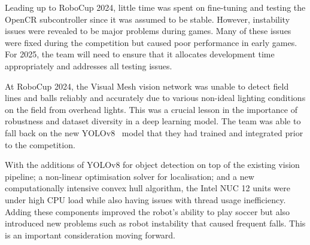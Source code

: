 \documentclass{llncs}
\begin{document}


Leading up to RoboCup 2024, little time was spent on fine-tuning and testing the OpenCR subcontroller since it was assumed to be stable. However, instability issues were revealed to be major problems during games. Many of these issues were fixed during the competition but caused poor performance in early games. For 2025, the team will need to ensure that it allocates development time appropriately and addresses all testing issues.

At RoboCup 2024, the Visual Mesh vision network was unable to detect field lines and balls reliably and accurately due to various non-ideal lighting conditions on the field from overhead lights. This was a crucial lesson in the importance of robustness and dataset diversity in a deep learning model. The team was able to fall back on the new YOLOv8~\cite{Varghese2024} model that they had trained and integrated prior to the competition.

With the additions of YOLOv8 for object detection on top of the existing vision pipeline; a non-linear optimisation solver for localisation; and a new computationally intensive convex hull algorithm, the Intel NUC 12 units were under high CPU load while also having issues with thread usage inefficiency. Adding these components improved the robot's ability to play soccer but also introduced new problems such as robot instability that caused frequent falls. This is an important consideration moving forward.\newline
\end{document}

